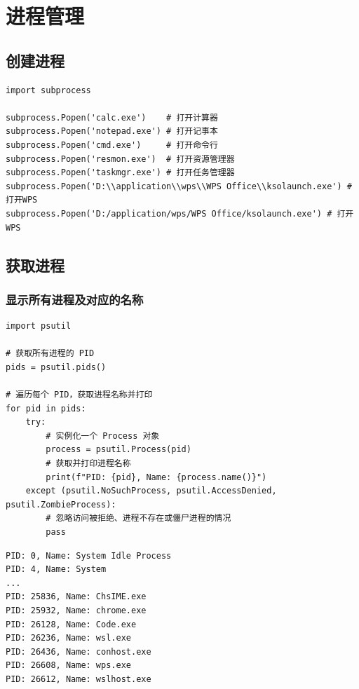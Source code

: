 \chapter{进程管理}

\section{创建进程}
\begin{lstlisting}[style=demostyle,numbers=none]
import subprocess

subprocess.Popen('calc.exe')    # 打开计算器
subprocess.Popen('notepad.exe') # 打开记事本
subprocess.Popen('cmd.exe')     # 打开命令行
subprocess.Popen('resmon.exe')  # 打开资源管理器
subprocess.Popen('taskmgr.exe') # 打开任务管理器
subprocess.Popen('D:\\application\\wps\\WPS Office\\ksolaunch.exe') # 打开WPS
subprocess.Popen('D:/application/wps/WPS Office/ksolaunch.exe') # 打开WPS
\end{lstlisting}

\section{获取进程}
\subsection{显示所有进程及对应的名称}
\begin{lstlisting}[style=demostyle,numbers=none]
import psutil

# 获取所有进程的 PID
pids = psutil.pids()

# 遍历每个 PID，获取进程名称并打印
for pid in pids:
    try:
        # 实例化一个 Process 对象
        process = psutil.Process(pid)
        # 获取并打印进程名称
        print(f"PID: {pid}, Name: {process.name()}")
    except (psutil.NoSuchProcess, psutil.AccessDenied, psutil.ZombieProcess):
        # 忽略访问被拒绝、进程不存在或僵尸进程的情况
        pass
\end{lstlisting}
\begin{lstlisting}[style=demostyle,numbers=none]
PID: 0, Name: System Idle Process
PID: 4, Name: System
...
PID: 25836, Name: ChsIME.exe
PID: 25932, Name: chrome.exe
PID: 26128, Name: Code.exe
PID: 26236, Name: wsl.exe
PID: 26436, Name: conhost.exe
PID: 26608, Name: wps.exe
PID: 26612, Name: wslhost.exe
\end{lstlisting}

